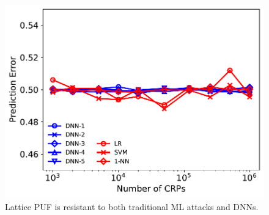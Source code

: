 \begin{figure}[t!]
\centering
\includegraphics[width = 0.7\linewidth]{./figs/ml_attack_lattice_puf.pdf}
\caption{Lattice PUF is resistant to both traditional ML attacks and DNNs.}
\label{fig:ml_attack_3}
\end{figure}


